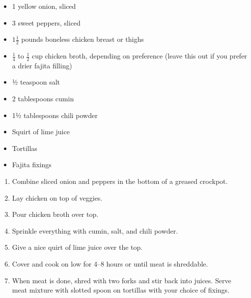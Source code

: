 \fromMom

\ingredients

\begin{itemize}
\item   1 yellow onion, sliced
\item   3 sweet peppers, sliced
\item   $1 \frac{1}{2}$  pounds boneless chicken breast or thighs
\item   $\frac{1}{4}$ to $\frac{1}{2}$ cup chicken broth, depending on preference (leave this out
    if you prefer a drier fajita filling)
\item   ½ teaspoon salt
\item   2 tablespoons cumin
\item   1½ tablespoons chili powder
\item   Squirt of lime juice
\item   Tortillas
\item   Fajita fixings
        \end{itemize}

		\instructions
\begin{enumerate}
        \item  Combine sliced onion and peppers in the bottom of a greased crockpot.
        \item Lay chicken on top of veggies.
        \item Pour chicken broth over top.
        \item Sprinkle everything with cumin, salt, and chili powder.
        \item Give a nice quirt of lime juice over the top.
        \item Cover and cook on low for 4--8 hours or until meat is shreddable.
        \item When meat is done, shred with two forks and stir back into juices.  Serve meat mixture with slotted spoon on tortillas with your choice of fixings.
    \end{enumerate}
